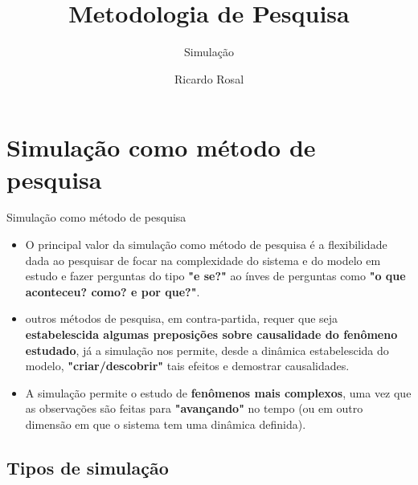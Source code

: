 \documentclass{beamer}
\title{Metodologia de Pesquisa}
\subtitle{Simulação}
\author{Ricardo Rosal}
\begin{document}
	\begin{frame}[plain]
	\maketitle
	\end{frame}	
	\begin{frame}
		\tableofcontents
	\end{frame}
	\section{Simulação como método de pesquisa}
	\begin{frame}{Simulação como método de pesquisa}
		\begin{itemize}[<+->]
			\item O principal valor da simulação como método de pesquisa é a flexibilidade dada ao pesquisar de focar na complexidade do sistema e do modelo em estudo e fazer perguntas do tipo \textbf{"e se?"} ao ínves de perguntas como \textbf{"o que aconteceu? como? e por que?"}.
			\item outros métodos de pesquisa, em contra-partida, requer que seja \textbf{estabelescida algumas preposições sobre causalidade do fenômeno estudado}, já a simulação nos permite, desde a dinâmica estabelescida do modelo, \textbf{"criar/descobrir"} tais efeitos e demostrar causalidades.
			\item A simulação permite o estudo de \textbf{fenômenos mais complexos}, uma vez que as observações são feitas para \textbf{"avançando"} no tempo (ou em outro dimensão em que o sistema tem uma dinâmica definida).
		\end{itemize}
	\end{frame}
	\subsection{Tipos de simulação}
\end{document}
